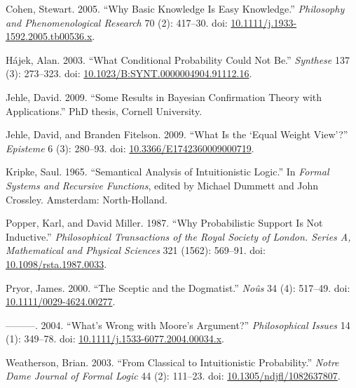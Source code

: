 \documentclass[
  11pt,
  letterpaper,
  DIV=11,
  numbers=noendperiod,
  twoside]{scrartcl}
\newlength{\cslhangindent}
\newenvironment{CSLReferences}[2] %
 {\begin{list}{}{%
  \setlength{\itemindent}{0pt}
  \setlength{\leftmargin}{0pt}
  \setlength{\parsep}{0pt}
  \ifodd #1
   \setlength{\leftmargin}{\cslhangindent}
   \setlength{\itemindent}{-1\cslhangindent}
  \fi
  \setlength{\itemsep}{#2\baselineskip}}}
 {\end{list}}
\begin{document}
\label{refs}
\begin{CSLReferences}{1}{0}
Cohen, Stewart. 2005. {``Why Basic Knowledge Is Easy Knowledge.''}
\emph{Philosophy and Phenomenological Research} 70 (2): 417--30. doi:
\href{https://doi.org/10.1111/j.1933-1592.2005.tb00536.x}{10.1111/j.1933-1592.2005.tb00536.x}.

Hájek, Alan. 2003. {``What Conditional Probability Could Not Be.''}
\emph{Synthese} 137 (3): 273--323. doi:
\href{https://doi.org/10.1023/B:SYNT.0000004904.91112.16}{10.1023/B:SYNT.0000004904.91112.16}.

Jehle, David. 2009. {``Some Results in Bayesian Confirmation Theory with
Applications.''} PhD thesis, Cornell University.

Jehle, David, and Branden Fitelson. 2009. {``What Is the {`Equal Weight
View'}?''} \emph{Episteme} 6 (3): 280--93. doi:
\href{https://doi.org/10.3366/E1742360009000719}{10.3366/E1742360009000719}.

Kripke, Saul. 1965. {``Semantical Analysis of Intuitionistic Logic.''}
In \emph{Formal Systems and Recursive Functions}, edited by Michael
Dummett and John Crossley. Amsterdam: North-Holland.

Popper, Karl, and David Miller. 1987. {``Why Probabilistic Support Is
Not Inductive.''} \emph{Philosophical Transactions of the Royal Society
of London. Series A, Mathematical and Physical Sciences} 321 (1562):
569--91. doi:
\href{https://doi.org/10.1098/rsta.1987.0033}{10.1098/rsta.1987.0033}.

Pryor, James. 2000. {``The Sceptic and the Dogmatist.''} \emph{No{û}s}
34 (4): 517--49. doi:
\href{https://doi.org/10.1111/0029-4624.00277}{10.1111/0029-4624.00277}.

---------. 2004. {``What's Wrong with Moore's Argument?''}
\emph{Philosophical Issues} 14 (1): 349--78. doi:
\href{https://doi.org/10.1111/j.1533-6077.2004.00034.x}{10.1111/j.1533-6077.2004.00034.x}.

Weatherson, Brian. 2003. {``From Classical to Intuitionistic
Probability.''} \emph{Notre Dame Journal of Formal Logic} 44 (2):
111--23. doi:
\href{https://doi.org/10.1305/ndjfl/1082637807}{10.1305/ndjfl/1082637807}.


\end{CSLReferences}
\end{document}
